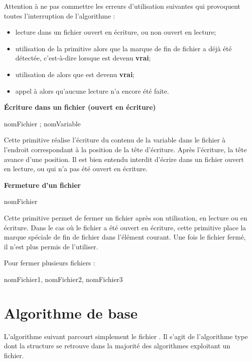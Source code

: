 {
Attention à ne pas commettre les erreurs d’utilisation suivantes qui
provoquent toutes l’interruption de l’algorithme : }

\liststyleListv
\begin{itemize}
\item {
lecture dans un fichier ouvert en écriture, ou non ouvert en lecture; }
\item {
utilisation de la primitive  alors que la marque de
fin de fichier a déjà été détectée, c’est-à-dire lorsque
 est devenu \textbf{vrai};}
\item {
utilisation de  alors que
 est devenu \textbf{vrai};}
\item {
appel à  alors
qu'aucune lecture n'a encore été
faite.}
\end{itemize}
{\sffamily\bfseries
Écriture dans un fichier (ouvert en écriture) }

{\sffamily
{} nomFichier ; nomVariable }

{
Cette primitive réalise l’écriture du contenu de la variable
 dans le fichier
 à l’endroit correspondant à la position
de la tête d’écriture. Après l’écriture, la tête avance d’une position.
Il est bien entendu interdit d’écrire dans un fichier ouvert en
lecture, ou qui n’a pas été ouvert en écriture. }

{\sffamily\bfseries\upshape
Fermeture d’un fichier }

{\sffamily
{} nomFichier }

{
Cette primitive permet de fermer un fichier après son utilisation, en
lecture ou en écriture. Dans le cas où le fichier a été ouvert en
écriture, cette primitive place la marque spéciale de fin de fichier
dans l’élément courant. Une fois le fichier fermé, il
n'est plus permis de l'utiliser.}

{
Pour fermer plusieurs fichiers :}

{\sffamily
{} nomFichier1, nomFichier2, nomFichier3 }

\section{Algorithme de base }
{
L’algorithme suivant parcourt simplement le fichier
. Il s’agit de l’algorithme type dont la
structure se retrouve dans la majorité des algorithmes exploitant un
fichier. }

